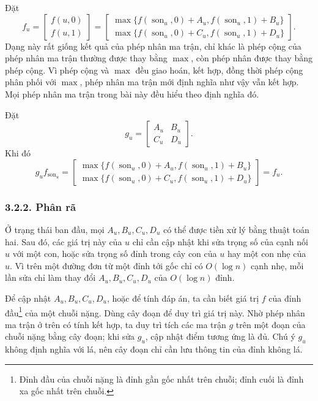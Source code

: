 \documentclass[11pt]{article}
\begin{document}
Đặt
\[
f_u=\begin{bmatrix}f(u,0)\\ f(u,1)\end{bmatrix}
=\begin{bmatrix}
\max\{f(\operatorname{son}_u,0)+A_u,
      f(\operatorname{son}_u,1)+B_u\}\\
\max\{f(\operatorname{son}_u,0)+C_u,
      f(\operatorname{son}_u,1)+D_u\}
\end{bmatrix}.
\]
Dạng này rất giống kết quả của phép nhân ma trận, chỉ khác là phép cộng của
phép nhân ma trận thường được thay bằng \(\max\), còn phép nhân được thay bằng
phép cộng. Vì phép cộng và \(\max\) đều giao hoán, kết hợp, đồng thời phép
cộng phân phối với \(\max\), phép nhân ma trận mới định nghĩa như vậy vẫn kết
hợp. Mọi phép nhân ma trận trong bài này đều hiểu theo định nghĩa đó.

Đặt
\[
  g_u=\begin{bmatrix}A_u&B_u\\ C_u&D_u\end{bmatrix}.
\]
Khi đó
\[
  g_u f_{\operatorname{son}_u}
  =
  \begin{bmatrix}
  \max\{f(\operatorname{son}_u,0)+A_u,
        f(\operatorname{son}_u,1)+B_u\}\\
  \max\{f(\operatorname{son}_u,0)+C_u,
        f(\operatorname{son}_u,1)+D_u\}
  \end{bmatrix}
  = f_u.
\]

\subsubsection*{3.2.2. Phân rã}

Ở trạng thái ban đầu, mọi \(A_u,B_u,C_u,D_u\) có thể được tiền xử lý bằng
thuật toán hai. Sau đó, các giá trị này của \(u\) chỉ cần cập nhật khi sửa
trọng số của cạnh nối \(u\) với một con, hoặc sửa trọng số đỉnh trong cây con
của \(u\) hay một con nhẹ của \(u\). Vì trên một đường đơn từ một đỉnh tới gốc
chỉ có \(O(\log n)\) cạnh nhẹ, mỗi lần sửa chỉ làm thay đổi \(A_u,B_u,C_u,D_u\)
của \(O(\log n)\) đỉnh.

Để cập nhật \(A_u,B_u,C_u,D_u\), hoặc để tính đáp án, ta cần biết giá trị
\(f\) của đỉnh đầu\footnote{Đỉnh đầu của chuỗi nặng là đỉnh gần gốc nhất trên
chuỗi; đỉnh cuối là đỉnh xa gốc nhất trên chuỗi.} của một chuỗi nặng. Dùng
cây đoạn để duy trì giá trị này. Nhờ phép nhân ma trận ở trên có tính kết hợp,
ta duy trì tích các ma trận \(g\) trên một đoạn của chuỗi nặng bằng cây đoạn;
khi sửa \(g_u\), cập nhật điểm tương ứng là đủ. Chú ý \(g_u\) không định nghĩa
với lá, nên cây đoạn chỉ cần lưu thông tin của đỉnh không lá.
\end{document}
